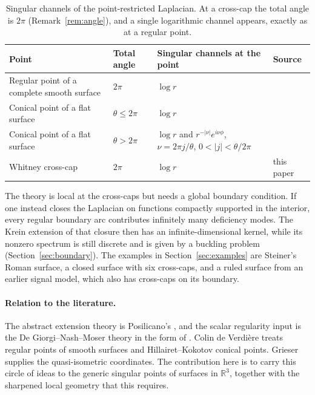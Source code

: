 \documentclass[11pt]{article}
\theoremstyle{definition}\newtheorem{definition}[theorem]{Definition}
\theoremstyle{remark}\newtheorem{remark}[theorem]{Remark}
\newcommand{\R}{\mathbb R}\newcommand{\C}{\mathbb C}\newcommand{\Z}{\mathbb Z}
\begin{document}
\begin{table}[t]\centering\small\renewcommand{\arraystretch}{1.3}
\begin{tabular}{@{}>{\raggedright\arraybackslash}p{.30\linewidth}>{\raggedright\arraybackslash}p{.14\linewidth}>{\raggedright\arraybackslash}p{.36\linewidth}l@{}}\toprule
Point & Total angle & Singular channels at the point & Source\\\midrule
Regular point of a complete smooth surface & $2\pi$ & $\log r$ & \cite{cdv}\\
Conical point of a flat surface & $\theta\leq2\pi$ & $\log r$ & \cite{hk}\\
Conical point of a flat surface & $\theta>2\pi$ & $\log r$ and $r^{-|\nu|}e^{i\nu\phi}$, $\nu=2\pi j/\theta$, $0<|j|<\theta/2\pi$ & \cite{hk}\\
Whitney cross-cap & $2\pi$ & $\log r$ & this paper\\\bottomrule
\end{tabular}
\caption{Singular channels of the point-restricted Laplacian. At a cross-cap
the total angle is $2\pi$ (Remark~\ref{rem:angle}), and a single logarithmic
channel appears, exactly as at a regular point.}\label{tab:channels}
\end{table}

The theory is local at the cross-caps but needs a global boundary condition.
If one instead closes the Laplacian on functions compactly supported in the
interior, every regular boundary arc contributes infinitely many deficiency
modes. The Krein extension of that closure then has an infinite-dimensional
kernel, while its nonzero spectrum is still discrete and is given by a
buckling problem (Section~\ref{sec:boundary}). The examples in Section~\ref{sec:examples}
are Steiner's Roman surface, a closed surface with six cross-caps, and a ruled
surface from an earlier signal model, which also has cross-caps on its boundary.

\paragraph{Relation to the literature.} The abstract extension theory is
Posilicano's \cite{pos}, and the scalar regularity input is the
De Giorgi--Nash--Moser theory in the form of \cite{simon}. Colin de Verdière
\cite{cdv} treats regular points of smooth surfaces and Hillairet--Kokotov
\cite{hk} conical points. Grieser \cite{grieser} supplies the quasi-isometric
coordinates. The contribution here is to carry this circle of ideas to the
generic singular points of surfaces in $\R^3$, together with the sharpened
local geometry that this requires.
\end{document}
